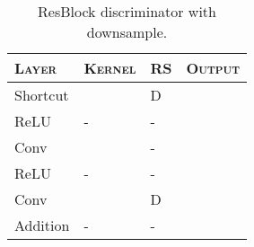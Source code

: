 \documentclass{article}
\begin{document}
\begin{table}[h]
 \centering
\caption{\label{tab:resblock_discriminator}ResBlock discriminator with downsample.\vspace{0.2cm}}
\begin{tabular}{llll}
  \toprule
      \textsc{Layer} & \textsc{Kernel}& \textsc{RS} & \textsc{Output} \\\toprule
      Shortcut &  & D &  \\ \midrule
      ReLU & - & - &  \\
      Conv &  & - &  \\
      ReLU & - & - &  \\
      Conv &  & D &  \\ \midrule
      Addition & - & - &  \\ \bottomrule
    \end{tabular}
\end{table}
\end{document}
